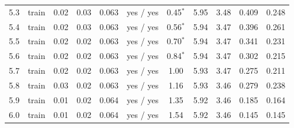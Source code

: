 {\begin{longtable}{llccccccccc}
\rule[-3pt]{0pt}{11.5pt} 5.3 & train & 0.02 & 0.03 & 0.063 & yes / yes & 0.45$^{\ast}$ & 5.95 & 3.48 & 0.409 & 0.248 \\
\rule[-3pt]{0pt}{11.5pt} 5.4 & train & 0.02 & 0.03 & 0.063 & yes / yes & 0.56$^{\ast}$ & 5.94 & 3.47 & 0.396 & 0.261 \\
\rule[-3pt]{0pt}{11.5pt} 5.5 & train & 0.02 & 0.02 & 0.063 & yes / yes & 0.70$^{\ast}$ & 5.94 & 3.47 & 0.341 & 0.231 \\
\rule[-3pt]{0pt}{11.5pt} 5.6 & train & 0.02 & 0.02 & 0.063 & yes / yes & 0.84$^{\ast}$ & 5.94 & 3.47 & 0.302 & 0.215 \\
\rule[-3pt]{0pt}{11.5pt} 5.7 & train & 0.02 & 0.02 & 0.063 & yes / yes & 1.00 & 5.93 & 3.47 & 0.275 & 0.211 \\
\rule[-3pt]{0pt}{11.5pt} 5.8 & train & 0.03 & 0.02 & 0.063 & yes / yes & 1.16 & 5.93 & 3.46 & 0.279 & 0.238 \\
\rule[-3pt]{0pt}{11.5pt} 5.9 & train & 0.01 & 0.02 & 0.064 & yes / yes & 1.35 & 5.92 & 3.46 & 0.185 & 0.164 \\
\rule[-3pt]{0pt}{11.5pt} 6.0 & train & 0.01 & 0.02 & 0.064 & yes / yes & 1.54 & 5.92 & 3.46 & 0.145 & 0.145 \\
\bottomrule
\end{longtable}}
